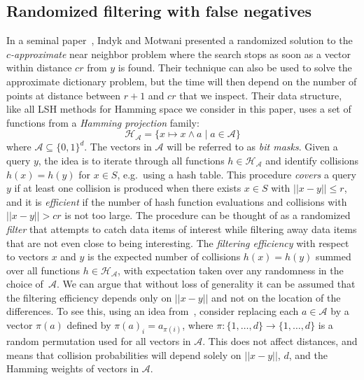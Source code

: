 \documentclass[prodmode,acmtalg]{acmsmall}
\begin{document}
\subsection{Randomized filtering with false negatives}\label{sec:lsh}

In a seminal paper~\cite{Indyk1998}, Indyk and Motwani presented 
a randomized solution to the \emph{$c$-approximate} near neighbor problem where the search stops as soon as a vector within distance $cr$ from $y$ is found.
Their technique can also be used to solve the approximate dictionary problem, but the time will then depend on the number of points at distance between $r+1$ and $cr$ that we inspect.
Their data structure, like all LSH methods for Hamming space we consider in this paper, uses a set of functions from a \emph{Hamming projection} family:
\begin{equation}\label{eq:hamming-projection}
\mathcal{H}_\mathcal{A} = \{ x \mapsto x \wedge a \; | \; a\in \mathcal{A} \}
\end{equation}
where $\mathcal{A}\subseteq \{0,1\}^d$.
The vectors in $\mathcal{A}$ will be referred to as \emph{bit masks}.
Given a query $y$, the idea is to iterate through all functions $h\in \mathcal{H}_\mathcal{A}$ and identify collisions $h(x)=h(y)$ for $x\in S$, e.g.~using a hash table.
This procedure \emph{covers} a query $y$ if at least one collision is produced when there exists $x\in S$ with $||x-y||\leq r$, and it is \emph{efficient} if the number of hash function evaluations and collisions with $||x-y|| > cr$ is not too large.
The procedure can be thought of as a randomized \emph{filter} that attempts to catch data items of interest while filtering away data items that are not even close to being interesting.
The \emph{filtering efficiency} with respect to vectors $x$ and $y$ is the expected number of collisions $h(x)=h(y)$ summed over all functions  $h\in \mathcal{H}_\mathcal{A}$, with expectation taken over any randomness in the choice of~$\mathcal{A}$.
We can argue that without loss of generality it can be assumed that the filtering efficiency depends only on $||x-y||$ and not on the location of the differences.
To see this, using an idea from~\cite{Arasu_VLDB06}, consider replacing each $a\in \mathcal{A}$ by a vector $\pi(a)$ defined by $\pi(a)_i = a_{\pi(i)}$, where $\pi: \{1,\dots,d\}\rightarrow \{1,\dots,d\}$ is a random permutation used for all vectors in $\mathcal{A}$.
This does not affect distances, and means that collision probabilities will depend solely on $||x-y||$, $d$, and the Hamming weights of vectors in $\mathcal{A}$.
\end{document}
